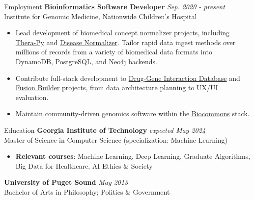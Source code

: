 \documentclass{cv} %
\begin{document}
\begin{rSection}{Employment}
{\bf Bioinformatics Software Developer} \hfill {\em Sep. 2020 - present}\\
Institute for Genomic Medicine, Nationwide Children's Hospital
\begin{itemize}[leftmargin=*]
    \item Lead development of biomedical concept normalizer projects, including \href{https://github.com/cancervariants/therapy-normalization}{Thera-Py} and \href{https://github.com/cancervariants/disease-normalization}{Disease Normalizer}. Tailor rapid data ingest methods over millions of records from a variety of biomedical data formats into DynamoDB, PostgreSQL, and Neo4j backends.
    \item Contribute full-stack development to \href{https://dgidb.org}{Drug-Gene Interaction Database} and \href{http://fusion-builder.cancervariants.org/}{Fusion Builder} projects, from data architecture planning to UX/UI evaluation.
    \item Maintain community-driven genomics software within the \href{https://biocommons.org/en/latest/}{Biocommons} stack.
\end{itemize}
\end{rSection}


\begin{rSection}{Education}
{\bf Georgia Institute of Technology} \hfill {\em expected May 2024}\\
Master of Science in Computer Science (specialization: Machine Learning)
\begin{itemize}[leftmargin=*]
    \item \small{\textbf{Relevant courses}: Machine Learning, Deep Learning, Graduate Algorithms, Big Data for Healthcare, AI Ethics \& Society}
\end{itemize}

{\bf University of Puget Sound} \hfill {\em May 2013}\\
Bachelor of Arts in Philosophy; Politics \& Government
\end{rSection}
\end{document}
